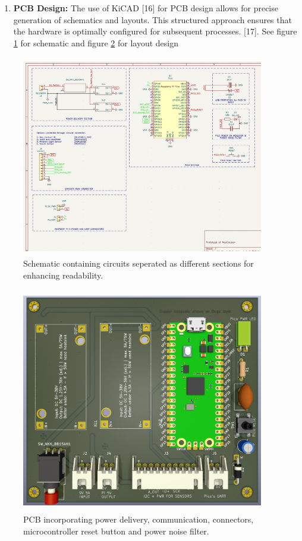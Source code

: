 \documentclass{article}
\providecommand{\tightlist}{%
  \setlength{\itemsep}{0pt}\setlength{\parskip}{0pt}}
\begin{document}
\begin{enumerate}
\def\labelenumi{\arabic{enumi}.}
\tightlist
\item
  \textbf{PCB Design:} The use of KiCAD {[}16{]} for PCB design allows
  for precise generation of schematics and layouts. This structured
  approach ensures that the hardware is optimally configured for
  subsequent processes. {[}17{]}. See figure \ref{fig:fig5} for
  schematic and figure \ref{fig:fig6} for layout design
\end{enumerate}

\begin{figure}
  \centering
  \includegraphics[width=300pt,height=250pt]{images/schematic.jpeg} %
  \caption{Schematic containing circuits seperated as different sections for enhancing readability.}
  \label{fig:fig5}
\end{figure}

\begin{figure}
  \centering
  \includegraphics[width=300pt,height=280pt]{images/pcb.png} %
  \caption{PCB incorporating power delivery, communication, connectors, microcontroller reset button and power noise filter.}
  \label{fig:fig6}
\end{figure}
\end{document}
